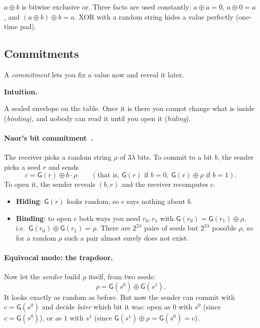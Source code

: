 \documentclass[11pt,a4paper]{article}
\newcommand{\Gf}{\mathsf{G}}
\newenvironment{intuition}[1][Intuition]{%
  \def\FrameCommand{\fboxsep=8pt\fcolorbox{boxrule}{boxbg}}%
  \MakeFramed{\advance\hsize-2\fboxsep\FrameRestore}%
  \noindent\textbf{#1.}\par\smallskip%
  \itshape
}{\endMakeFramed}
\theoremstyle{definition}
\begin{document}
$a \oplus b$ is bitwise exclusive or. Three facts are used constantly:
$a \oplus a = 0$, $a \oplus 0 = a$, and $(a \oplus b) \oplus b = a$. XOR
with a random string hides a value perfectly (one-time pad).

\subsection{Commitments}
\label{sec:commit}

A \emph{commitment} lets you fix a value now and reveal it later.

\begin{intuition}
A sealed envelope on the table. Once it is there you cannot change what is
inside (\emph{binding}), and nobody can read it until you open it
(\emph{hiding}).
\end{intuition}

\paragraph{Naor's bit commitment~\cite{Naor91}.} The receiver picks a random
string $\rho$ of $3\lambda$ bits. To commit to a bit $b$, the sender picks
a seed $r$ and sends
\[ c = \Gf(r) \oplus b\cdot\rho \qquad(\text{that is, } \Gf(r)
\text{ if } b = 0,\ \Gf(r) \oplus \rho \text{ if } b = 1). \]
To open it, the sender reveals $(b, r)$ and the receiver recomputes $c$.
\begin{itemize}[leftmargin=*]
\item \textbf{Hiding}: $\Gf(r)$ looks random, so $c$ says nothing about $b$.
\item \textbf{Binding}: to open $c$ both ways you need $r_0, r_1$ with
      $\Gf(r_0) = \Gf(r_1) \oplus \rho$, i.e.\ $\Gf(r_0) \oplus \Gf(r_1)
      = \rho$. There are $2^{2\lambda}$ pairs of seeds but $2^{3\lambda}$
      possible $\rho$, so for a random $\rho$ such a pair almost surely
      does not exist.
\end{itemize}

\paragraph{Equivocal mode: the trapdoor.} Now let the \emph{sender} build
$\rho$ itself, from two seeds:
\[ \rho = \Gf(s^0) \oplus \Gf(s^1). \]
It looks exactly as random as before. But now the sender can commit with
$c = \Gf(s^0)$ and decide \emph{later} which bit it was: open as $0$ with
$s^0$ (since $c = \Gf(s^0)$), or as $1$ with $s^1$ (since $\Gf(s^1) \oplus
\rho = \Gf(s^0) = c$).
\end{document}
